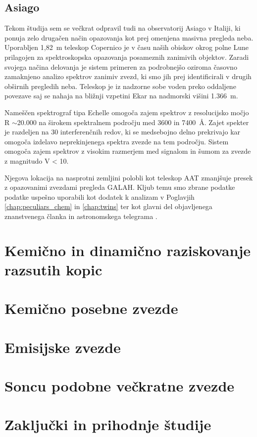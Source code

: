 \subsection{Asiago}
\label{sec:slo_asiago}
Tekom študija sem se večkrat odpravil tudi na observatorij Asiago v Italiji, ki ponuja zelo drugačen način opazovanja kot prej omenjena masivna pregleda neba. Uporabljen 1,82~m teleskop Copernico je v času naših obiskov okrog polne Lune prilagojen za spektroskopska opazovanja posameznih zanimivih objektov. Zaradi svojega načina delovanja je sistem primeren za podrobnejšo oziroma časovno zamaknjeno analizo spektrov zanimiv zvezd, ki smo jih prej identificirali v drugih obširnih pregledih neba. Teleskop je iz nadzorne sobe voden preko oddaljene povezave saj se nahaja na bližnji vzpetini Ekar na nadmorski višini 1.366~m. 

Nameščen spektrograf tipa Echelle omogoča zajem spektrov z resolucijsko močjo R $\sim$20.000 na širokem spektralnem področju med 3600 in 7400~\AA. Zajet spekter je razdeljen na 30 interferenčnih redov, ki se medsebojno delno prekrivajo kar omogoča izdelavo neprekinjenega spektra zvezde na tem področju. Sistem omogoča zajem spektrov z visokim razmerjem med signalom in šumom za zvezde z magnitudo V < 10. 

Njegova lokacija na nasprotni zemljini polobli kot teleskop AAT zmanjšuje presek z opazovanimi zvezdami pregleda GALAH. Kljub temu smo zbrane podatke podatke uspešno uporabili kot dodatek k analizam v Poglavjih \ref{chap:peculiars_chem} in \ref{chap:twins} ter kot glavni del objavljenega znanstvenega članka \cite{2019MNRAS.488.5536M} in astronomskega telegrama \cite{2019ATel13340....1M}.

\section{Kemično in dinamično raziskovanje razsutih kopic}
\label{sec:slo_kopice_taziskovanje}


\section{Kemično posebne zvezde}
\label{sec:slo_c_peculiars}


\section{Emisijske zvezde}
\label{sec:slo_emisijske}


\section{Soncu podobne večkratne zvezde}
\label{sec:slo_soncevi_veckratniki}


\section{Zaključki in prihodnje študije}
\label{sec:slo_zakljucek}

